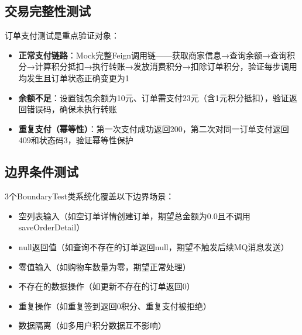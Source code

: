 \subsection{交易完整性测试}

订单支付测试是重点验证对象：

\begin{itemize}
	\item \textbf{正常支付链路}：Mock完整Feign调用链——获取商家信息→查询余额→查询积分→计算积分抵扣→执行转账→发放消费积分→扣除订单积分，验证每步调用均发生且订单状态正确变更为1
	\item \textbf{余额不足}：设置钱包余额为10元、订单需支付23元（含1元积分抵扣），验证返回错误码，确保未执行转账
	\item \textbf{重复支付（幂等性）}：第一次支付成功返回200，第二次对同一订单支付返回409和状态码3，验证幂等性保护
\end{itemize}

\subsection{边界条件测试}

3个BoundaryTest类系统化覆盖以下边界场景：

\begin{itemize}
	\item 空列表输入（如空订单详情创建订单，期望总金额为0.0且不调用saveOrderDetail）
	\item null返回值（如查询不存在的订单返回null，期望不触发后续MQ消息发送）
	\item 零值输入（如购物车数量为零，期望正常处理）
	\item 不存在的数据操作（如更新不存在的订单返回0）
	\item 重复操作（如重复签到返回0积分、重复支付被拒绝）
	\item 数据隔离（如多用户积分数据互不影响）
\end{itemize}
